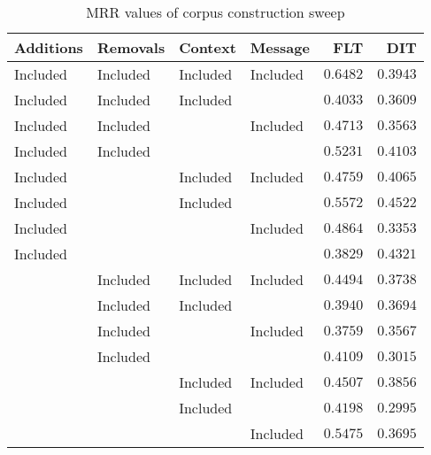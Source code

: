 
\begin{table}
\begin{spacing}{1.2}
\centering
\caption{MRR values of \tika corpus construction sweep}
\label{table:tika_corpus_sweep}
\vspace{0.2em}
\begin{tabular}{llll|rr}
\toprule
Additions &  Removals &   Context &   Message &           FLT &           DIT \\
\midrule
 Included &  Included &  Included &  Included & $\bm{0.6482}$ &      $0.3943$ \\
 \myrowcolor Included &  Included &  Included &           &      $0.4033$ &      $0.3609$ \\
 Included &  Included &           &  Included &      $0.4713$ &      $0.3563$ \\
 Included &  Included &           &           &      $0.5231$ &      $0.4103$ \\
 Included &           &  Included &  Included &      $0.4759$ &      $0.4065$ \\
 Included &           &  Included &           &      $0.5572$ & $\bm{0.4522}$ \\
 Included &           &           &  Included &      $0.4864$ &      $0.3353$ \\
 Included &           &           &           &      $0.3829$ &      $0.4321$ \\
          &  Included &  Included &  Included &      $0.4494$ &      $0.3738$ \\
          &  Included &  Included &           &      $0.3940$ &      $0.3694$ \\
          &  Included &           &  Included &      $0.3759$ &      $0.3567$ \\
          &  Included &           &           &      $0.4109$ &      $0.3015$ \\
          &           &  Included &  Included &      $0.4507$ &      $0.3856$ \\
          &           &  Included &           &      $0.4198$ &      $0.2995$ \\
          &           &           &  Included &      $0.5475$ &      $0.3695$ \\
\bottomrule
\end{tabular}

\end{spacing}
\end{table}

